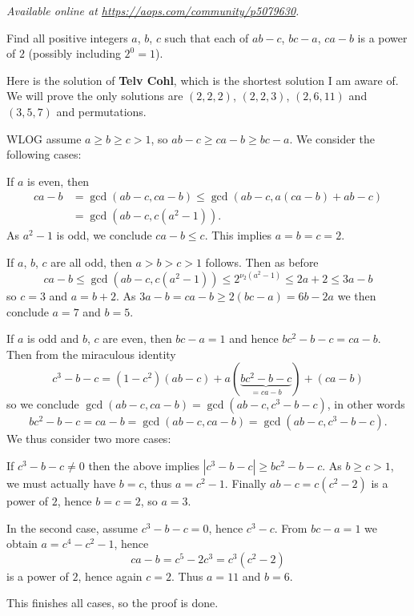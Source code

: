 \textsl{Available online at \url{https://aops.com/community/p5079630}.}
\begin{mdframed}[style=mdpurplebox,frametitle={Problem statement}]
Find all positive integers $a$, $b$, $c$ such that
each of $ab-c$, $bc-a$, $ca-b$ is a power of $2$
(possibly including $2^0=1$).
\end{mdframed}
Here is the solution of \textbf{Telv Cohl},
which is the shortest solution I am aware of.
We will prove the only solutions are $(2,2,2)$, $(2,2,3)$,
$(2,6,11)$ and $(3,5,7)$ and permutations.

WLOG assume $a \ge b \ge c > 1$, so $ab-c \ge ca-b \ge bc-a$.
We consider the following cases:
\begin{itemize}
  \ii If $a$ is even, then
  \begin{align*}
    ca-b &= \gcd (ab-c, ca-b) \le \gcd (ab-c, a(ca-b)+ab-c) \\
    &= \gcd\left( ab-c, c(a^2-1) \right).
  \end{align*}
  As $a^2-1$ is odd, we conclude $ca-b \le c$.
  This implies $a=b=c=2$.

  \ii If $a$, $b$, $c$ are all odd, then $a > b > c > 1$ follows.
  Then as before
  \[  ca-b \le \gcd (ab-c, c(a^2-1))
    \le 2^{\nu_2(a^2-1)} \le 2a+2 \le 3a-b \]
  so $c = 3$ and $a = b+2$.
  As $3a-b = ca-b \ge 2(bc-a) = 6b-2a$ we then conclude $a=7$ and $b=5$.

  \ii If $a$ is odd and $b$, $c$ are even, then $bc-a=1$
  and hence $bc^2 - b - c = ca - b$.
  Then from the miraculous identity
  \[ c^3-b-c = (1-c^2)(ab-c) + a(\underbrace{bc^2-b-c}_{=ca-b}) + (ca-b) \]
  so we conclude $\gcd(ab-c, ca-b) = \gcd(ab-c, c^3-b-c)$, in other words
  \[ bc^2-b-c = ca-b = \gcd(ab-c, ca-b) = \gcd(ab-c, c^3-b-c). \]
  We thus consider two more cases:
  \begin{itemize}
    \ii If $c^3-b-c \neq 0$ then
    the above implies $|c^3-b-c| \ge bc^2-b-c$.
    As $b \ge c > 1$, we must actually have $b = c$,
    thus $a = c^2-1$.
    Finally $ab-c = c(c^2-2)$ is a power of $2$, hence $b=c=2$, so $a=3$.

    \ii In the second case, assume $c^3-b-c = 0$, hence $c^3-c$.
    From $bc-a=1$ we obtain $a=c^4-c^2-1$,
    hence
    \[ ca-b = c^5-2c^3 = c^3(c^2-2) \]
    is a power of $2$, hence again $c = 2$.
    Thus $a=11$ and $b=6$.
  \end{itemize}
\end{itemize}
This finishes all cases, so the proof is done.
\pagebreak